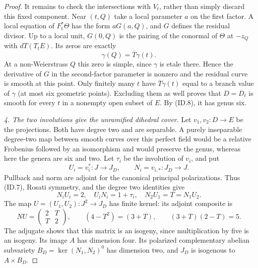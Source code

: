 \documentclass[11pt,a4paper]{article}
\begin{document}
\begin{proof}
It remains to check the intersections with $V_t$, rather
than simply discard this fixed component. Near $(t,Q)$
take a local parameter $a$ on the first factor. A local
equation of $F_t^*\Theta$ has the form $aG(a,Q)$, and $G$
defines the residual divisor. Up to a local unit,
$G(0,Q)$ is the pairing of the conormal of $\Theta$ at
$-z_Q$ with $dT(T_tE)$. Its zeros are exactly
\[
                         \gamma(Q)=\overline T\gamma(t).
 \tag{ID.15}
\]
At a non-Weierstrass $Q$ this zero is simple, since
$\gamma$ is etale there. Hence the derivative of $G$ in
the second-factor parameter is nonzero and the residual
curve is smooth at this point. Only finitely many $t$
have $\overline T\gamma(t)$ equal to a branch value of
$\gamma$ (at most six geometric points). Excluding them
as well proves that $D=D_t$ is smooth for every $t$ in a
nonempty open subset of $E$. By (ID.8), it has genus six.

\emph{4. The two involutions give the unramified dihedral cover.}
Let $v_1,v_2:D\to E$ be the projections. Both have degree
two and are separable. A purely inseparable degree-two map
between smooth curves over this perfect field would be a
relative Frobenius followed by an isomorphism and would
preserve the genus, whereas here the genera are six and two.
Let $\tau_i$ be the involution of $v_i$, and put
\[
 U_i=v_i^*:J\longrightarrow J_D,
       \qquad N_i=v_{i,*}:J_D\longrightarrow J.
 \tag{ID.16}
\]
Pullback and norm are adjoint for the canonical principal
polarizations. Thus (ID.7), Rosati symmetry, and the degree
two identities give
\[
 N_iU_i=2,\quad U_iN_i=1+\tau_i,\quad
 N_2U_1=T=N_1U_2.
 \tag{ID.17}
\]
The map $U=(U_1,U_2):J^2\to J_D$ has finite kernel:
its adjoint composite is
\[
 NU=\begin{pmatrix}2&T\\T&2\end{pmatrix},
 \qquad
 (4-T^2)=(3+T),\qquad (3+T)(2-T)=5.
 \tag{ID.18}
\]
The adjugate shows that this matrix is an isogeny, since
multiplication by five is an isogeny. Its image $A$ has
dimension four. Its polarized complementary abelian
subvariety $B_D=\ker(N_1,N_2)^0$ has dimension two, and
$J_D$ is isogenous to $A\times B_D$.


\end{proof}
\end{document}
